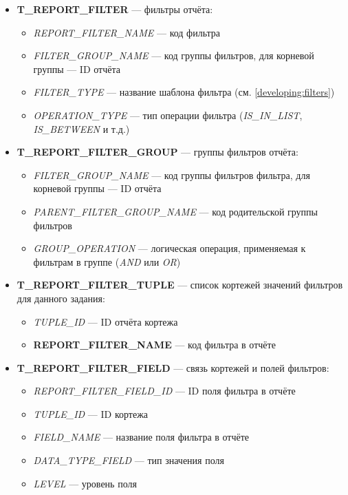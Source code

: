 \documentclass[../user-manual.tex]{subfiles}
\begin{document}
	\begin{itemize}
		\item \textbf{T\_REPORT\_FILTER} --- фильтры отчёта:
		
			\begin{itemize}
				\item \textit{REPORT\_FILTER\_NAME} --- код фильтра
				\item \textit{FILTER\_GROUP\_NAME} --- код группы фильтров, для корневой группы --- ID отчёта
				\item \textit{FILTER\_TYPE} --- название шаблона фильтра (см. \ref{developing:filters})
				\item \textit{OPERATION\_TYPE} --- тип операции фильтра (\textit{IS\_IN\_LIST}, \textit{IS\_BETWEEN} и т.д.)
			\end{itemize}
		
		\item \textbf{T\_REPORT\_FILTER\_GROUP} --- группы фильтров отчёта:
		
			\begin{itemize}
				\item \textit{FILTER\_GROUP\_NAME} --- код группы фильтров фильтра, для корневой группы --- ID отчёта
				\item \textit{PARENT\_FILTER\_GROUP\_NAME} --- код родительской группы фильтров
				\item \textit{GROUP\_OPERATION} --- логическая операция, применяемая к фильтрам в группе (\textit{AND} или \textit{OR})
			\end{itemize}
		
		\item \textbf{T\_REPORT\_FILTER\_TUPLE} --- список кортежей значений фильтров для данного задания:

			\begin{itemize}
				\item \textit{TUPLE\_ID} --- ID отчёта кортежа
				\item \textbf{REPORT\_FILTER\_NAME} --- код фильтра в отчёте           
			\end{itemize}		
		
		\item \textbf{T\_REPORT\_FILTER\_FIELD} --- связь кортежей и полей фильтров:
	
			\begin{itemize}
				\item \textit{REPORT\_FILTER\_FIELD\_ID} --- ID поля фильтра в отчёте
				\item \textit{TUPLE\_ID} --- ID кортежа
				\item \textit{FIELD\_NAME} --- название поля фильтра в отчёте
				\item \textit{DATA\_TYPE\_FIELD} --- тип значения поля
				\item \textit{LEVEL} --- уровень поля
			\end{itemize}
		

\end{itemize}
\end{document}
